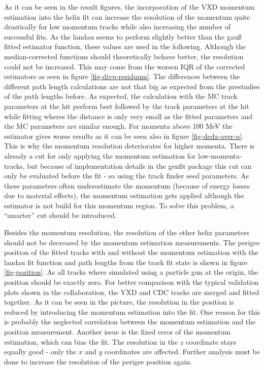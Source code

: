 As it can be seen in the result figures, the incorporation of the VXD momentum estimation into the helix fit can increase the resolution of the momentum quite drastically for low momentum tracks while also increasing the number of successful fits. As the landau seems to perform slightly better than the gauß fitted estimator function, these values are used in the following. Although the median-corrected functions should theoretically behave better, the resolution could not be increased. This may come from the worsen IQR of the corrected estimators as seen in figure \ref{fig-divp-residuum}. The differences between the different path length calculations are not that big as expected from the prestudies of the path lengths before. As expected, the calculation with the MC track parameters at the hit perform best followed by the track parameters at the hit while fitting wheres the distance is only very small as the fitted parameters and the MC parameters are similar enough. For momenta above 100 MeV the estimator gives worse results as it can be seen also in figure \ref{fig-dedx-over-p}. This is why the momentum resolution deteriorates for higher momenta. There is already a cut for only applying the momentum estimation for low-momenta-tracks, but because of implementation details in the genfit package this cut can only be evaluated before the fit - so using the track finder seed parameters. As these parameters often underestimate the momentum (because of energy losses due to material effects), the momentum estimation gets applied although the estimator is not build for this momentum region. To solve this problem, a ``smarter'' cut should be introduced.

Besides the momentum resolution, the resolution of the other helix parameters should not be decreased by the momentum estimation measurements. The perigee position of the fitted tracks with and without the momentum estimation with the landau fit function and path lengths from the track fit state is shown in figure \ref{fig-position}. As all tracks where simulated using a particle gun at the origin, the position should be exactly zero. For better comparison with the typical validation plots shown in the collaboration, the VXD and CDC tracks are merged and fitted together. As it can be seen in the picture, the resolution in the position is reduced by introducing the momentum estimation into the fit. One reason for this is probably the neglected correlation between the momentum estimation and the position measurement. Another issue is the fixed error of the momentum estimation, which can bias the fit. The resolution in the $z$ coordinate stays equally good - only the $x$ and $y$ coordinates are affected. Further analysis must be done to increase the resolution of the perigee position again.

